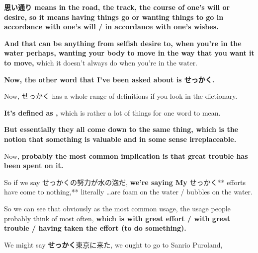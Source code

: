 {\bf 思い通り means in the road, the track, the course of one's will or desire, so it means having things go or wanting things to go in accordance with one's will / in accordance with one's wishes.}

\thinrule

{\bf And that can be anything from selfish desire to, when you're in the water perhaps, wanting your body to move in the way that you want it to move,} which it doesn't always do when you're in the water.

\stopsectionlevel

\stopsectionlevel

\startsectionlevel[title={せっかく},reference={せっかく}]

{\bf Now, the other word that I've been asked about is せっかく.}

Now, せっかく has a whole range of definitions if you look in the dictionary.

{}

{\bf It's defined as ,} which is rather a lot of things for one word to mean.

{\bf But essentially they all come down to the same thing, which is the notion that something is valuable and in some sense irreplaceable.}

\startsectionlevel[title={せっかく as do x with great effort / trouble and is too precious to replace},reference={せっかく-as-do-x-with-great-effort-trouble-and-is-too-precious-to-replace}]

Now, {\bf probably the most common implication is that great trouble has been spent on it.}

So if we say せっかくの努力が水の泡だ, {\bf we're saying My }せっかく** efforts have come to nothing,** literally \ldots{}are foam on the water / bubbles on the water.

{}

So we can see that obviously as the most common usage, the usage people probably think of most often, {\bf which is with great effort / with great trouble / having taken the effort (to do something).}

\thinrule

We might say {\bf せっかく}東京に来た, we ought to go to Sanrio Puroland,

{}

